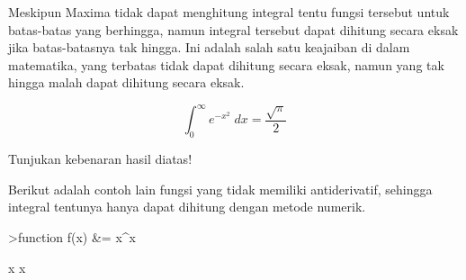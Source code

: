 \documentclass{article}
\begin{document}
\begin{eulernotebook}
\begin{eulercomment}
\begin{eulercomment}
\begin{eulercomment}
\begin{eulercomment}
\begin{eulercomment}
Meskipun Maxima tidak dapat menghitung integral tentu fungsi tersebut untuk
batas-batas yang berhingga, namun integral tersebut dapat dihitung secara eksak jika
batas-batasnya tak hingga. Ini adalah salah satu keajaiban di dalam matematika, yang
terbatas tidak dapat dihitung secara eksak, namun yang tak hingga malah dapat
dihitung secara eksak.
\end{eulercomment}
\begin{eulerformula}
\[
\int_{0}^{\infty }{e^ {- x^2 }\;dx}=\frac{\sqrt{\pi}}{2}
\]
\end{eulerformula}
\begin{eulercomment}
Tunjukan kebenaran hasil diatas!
\end{eulercomment}
\begin{eulercomment}
Berikut adalah contoh lain fungsi yang tidak memiliki antiderivatif,
sehingga integral tentunya hanya dapat dihitung dengan metode numerik.
\end{eulercomment}
\begin{eulerprompt}
>function f(x) &= x^x
\end{eulerprompt}
\begin{euleroutput}
  
                                     x
                                    x
  

\end{euleroutput}
\end{eulercomment}
\end{eulercomment}
\end{eulercomment}
\end{eulercomment}
\end{eulernotebook}
\end{document}

